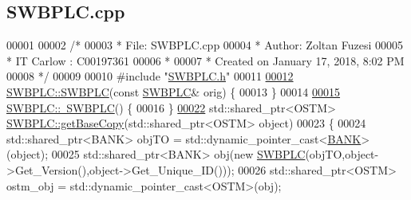 \hypertarget{_s_w_b_p_l_c_8cpp_source}{}\subsection{S\+W\+B\+P\+L\+C.\+cpp}

\begin{DoxyCode}
00001 
00002 \textcolor{comment}{/* }
00003 \textcolor{comment}{ * File:   SWBPLC.cpp}
00004 \textcolor{comment}{ * Author: Zoltan Fuzesi}
00005 \textcolor{comment}{ * IT Carlow : C00197361}
00006 \textcolor{comment}{ *}
00007 \textcolor{comment}{ * Created on January 17, 2018, 8:02 PM}
00008 \textcolor{comment}{ */}
00009 
00010 \textcolor{preprocessor}{#include "\hyperlink{_s_w_b_p_l_c_8h}{SWBPLC.h}"}
00011 
\hypertarget{_s_w_b_p_l_c_8cpp_source.tex_l00012}{}\hyperlink{class_s_w_b_p_l_c_a767c6ae2b15f523b5ec6e35e137dcc96}{00012} \hyperlink{class_s_w_b_p_l_c_a320f4e2b023038668d941ce5d0c46aeb}{SWBPLC::SWBPLC}(\textcolor{keyword}{const} \hyperlink{class_s_w_b_p_l_c}{SWBPLC}& orig) \{
00013 \}
00014 
\hypertarget{_s_w_b_p_l_c_8cpp_source.tex_l00015}{}\hyperlink{class_s_w_b_p_l_c_a5d6f00a76145f32424ff6db9ac23c6fe}{00015} \hyperlink{class_s_w_b_p_l_c_a5d6f00a76145f32424ff6db9ac23c6fe}{SWBPLC::~SWBPLC}() \{
00016 \}
\hypertarget{_s_w_b_p_l_c_8cpp_source.tex_l00022}{}\hyperlink{class_s_w_b_p_l_c_a77f0e0d6c08a95066d277bf6b2073a5c}{00022} std::shared\_ptr<OSTM> \hyperlink{class_s_w_b_p_l_c_a77f0e0d6c08a95066d277bf6b2073a5c}{SWBPLC::getBaseCopy}(std::shared\_ptr<OSTM> \textcolor{keywordtype}{object})
00023 \{
00024     std::shared\_ptr<BANK> objTO = std::dynamic\_pointer\_cast<\hyperlink{class_b_a_n_k}{BANK}>(object);
00025     std::shared\_ptr<BANK> obj(\textcolor{keyword}{new} \hyperlink{class_s_w_b_p_l_c_a320f4e2b023038668d941ce5d0c46aeb}{SWBPLC}(objTO,object->Get\_Version(),\textcolor{keywordtype}{object}->Get\_Unique\_ID())); 
00026     std::shared\_ptr<OSTM> ostm\_obj = std::dynamic\_pointer\_cast<OSTM>(obj);                                 
       

\end{DoxyCode}
